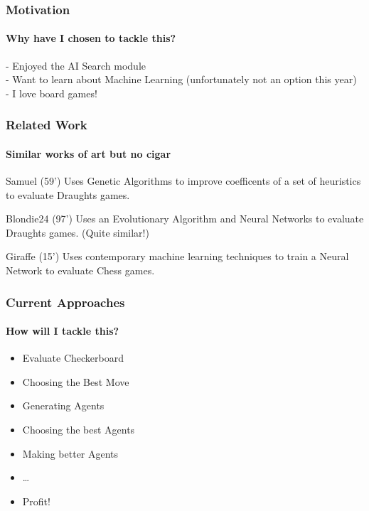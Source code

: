 \documentclass{beamer}
\begin{document}
\begin{frame}
	\frametitle{Motivation}
	\framesubtitle{Why have I chosen to tackle this?}

	- Enjoyed the AI Search module \\
	- Want to learn about Machine Learning (unfortunately not an option this year) \\
	- I love board games! \\

\end{frame}

\begin{frame}
	\frametitle{Related Work}
	\framesubtitle{Similar works of art but no cigar}
	\begin{block}{Samuel (59')}
		Uses Genetic Algorithms to improve coefficents of a set of heuristics to evaluate Draughts games.
	\end{block}
	\begin{block}{Blondie24 (97')}
		Uses an Evolutionary Algorithm and Neural Networks to evaluate Draughts games. (Quite similar!)
	\end{block}

	 \begin{block}{Giraffe (15')}
		Uses contemporary machine learning techniques to train a Neural Network to evaluate Chess games.
	 \end{block}
\end{frame}

\begin{frame}
	\frametitle{Current Approaches}
	\framesubtitle{How will I tackle this?}
	\begin{itemize}
		\item Evaluate Checkerboard
		\item Choosing the Best Move
		\item Generating Agents
		\item Choosing the best Agents
		\item Making better Agents
		\item \ldots
		\item Profit!
	\end{itemize}

\end{frame}
\end{document}
